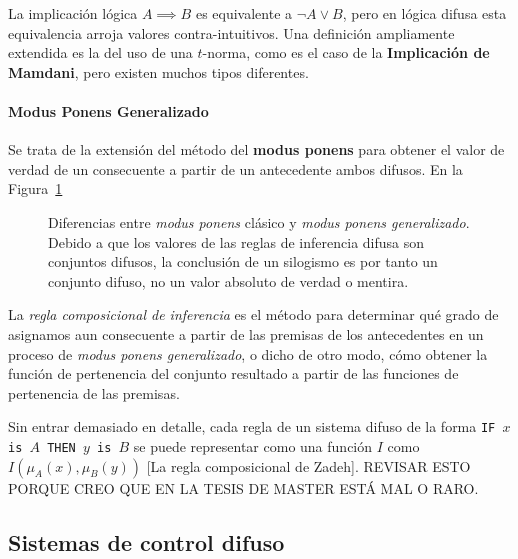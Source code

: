 La implicación lógica $A \implies B$ es equivalente a $\lnot A \lor B$, pero en lógica difusa esta equivalencia arroja valores contra-intuitivos. Una definición ampliamente extendida es la del uso de una $t$-norma, como es el caso de la \textbf{Implicación de Mamdani}, pero existen muchos tipos diferentes.

\paragraph{Modus Ponens Generalizado}

Se trata de la extensión del método del \textbf{modus ponens} para obtener el valor de verdad de un consecuente a partir de un antecedente ambos difusos. En la Figura~\ref{fig:modus-ponens-classic-vs-generalized}

\begin{figure}[!b]
	\centering
	\caption[Diferencias entre \textit{modus ponens} clásico y \textit{modus ponens generalizado}.]{Diferencias entre \textit{modus ponens} clásico y \textit{modus ponens generalizado}. Debido a que los valores de las reglas de inferencia difusa son conjuntos difusos, la conclusión de un silogismo es por tanto un conjunto difuso, no un valor absoluto de verdad o mentira.}
	\label{fig:modus-ponens-classic-vs-generalized}
\end{figure}

La \textit{regla composicional de inferencia} es el método para determinar qué grado de asignamos aun consecuente a partir de las premisas de los antecedentes en un proceso de \textit{modus ponens generalizado}, o dicho de otro modo, cómo obtener la función de pertenencia del conjunto resultado a partir de las funciones de pertenencia de las premisas.

Sin entrar demasiado en detalle, cada regla de un sistema difuso de la forma \texttt{IF $x$ is $A$ THEN $y$ is $B$} se puede representar como una función $I$ como $I(\mu_A(x), \mu_B(y))$ [La regla composicional de Zadeh]. REVISAR ESTO PORQUE CREO QUE EN LA TESIS DE MASTER ESTÁ MAL O RARO.

\subsection{Sistemas de control difuso}
\label{ss:fcs}

